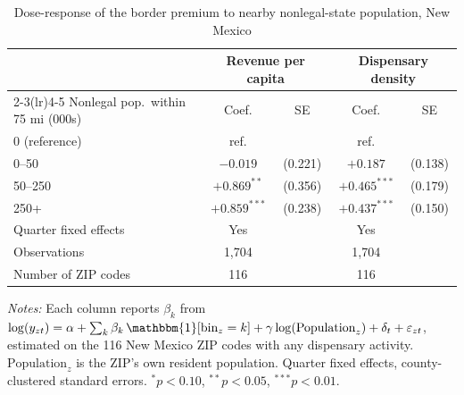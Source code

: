 \begin{table}[htbp]
\centering
\caption{Dose-response of the border premium to nearby nonlegal-state population, New Mexico}
\label{tab:nm_nonlegalpop_doseresponse}
\footnotesize
\begin{tabular}{lcccc}
\toprule
 & \multicolumn{2}{c}{Revenue per capita} & \multicolumn{2}{c}{Dispensary density} \\
\cmidrule(lr){2-3}\cmidrule(lr){4-5}
Nonlegal pop.\ within 75 mi (000s) & Coef. & SE & Coef. & SE \\
\midrule
0 (reference) & ref. & & ref. & \\
0--50 & $-0.019$ & (0.221) & $+0.187$ & (0.138) \\
50--250 & $+0.869^{**}$ & (0.356) & $+0.465^{***}$ & (0.179) \\
250+ & $+0.859^{***}$ & (0.238) & $+0.437^{***}$ & (0.150) \\
\midrule
Quarter fixed effects & Yes & & Yes & \\
Observations & 1,704 & & 1,704 & \\
Number of ZIP codes & 116 & & 116 & \\
\bottomrule
\end{tabular}
\begin{minipage}{0.92\textwidth}
\vspace{0.4em}\footnotesize
\textit{Notes:} Each column reports $\beta_k$ from $\log(y_{zt}) = \alpha + \sum_k \beta_k\,\mathbbm{1}[\text{bin}_z=k] + \gamma\log(\text{Population}_z) + \delta_t + \varepsilon_{zt}$, estimated on the 116 New Mexico ZIP codes with any dispensary activity. $\text{Population}_z$ is the ZIP's own resident population. Quarter fixed effects, county-clustered standard errors. $^{*}p<0.10$, $^{**}p<0.05$, $^{***}p<0.01$.
\end{minipage}
\end{table}
